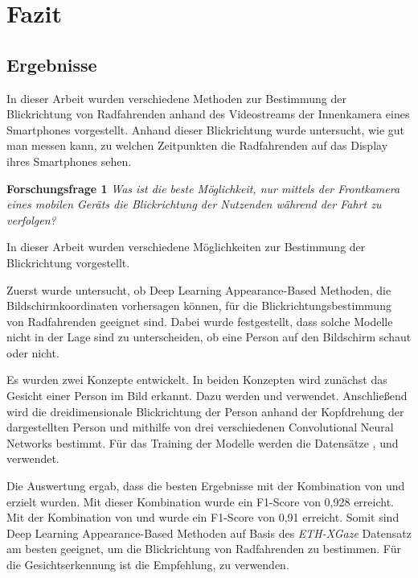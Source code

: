 \chapter{Fazit}\label{sec:fazit}

\section{Ergebnisse}

In dieser Arbeit wurden verschiedene Methoden zur Bestimmung der Blickrichtung von Radfahrenden anhand des Videostreams der Innenkamera eines Smartphones vorgestellt. Anhand dieser Blickrichtung wurde untersucht, wie gut man messen kann, zu welchen Zeitpunkten die Radfahrenden auf das Display ihres Smartphones sehen.

\vspace{0.3cm}
\noindent\textbf{Forschungsfrage 1} \textit{Was ist die beste Möglichkeit, nur mittels der Frontkamera eines mobilen Geräts die Blickrichtung der Nutzenden während der Fahrt zu verfolgen?}
\vspace{0.3cm}

In dieser Arbeit wurden verschiedene Möglichkeiten zur Bestimmung der Blickrichtung vorgestellt.

Zuerst wurde untersucht, ob Deep Learning Appearance-Based Methoden, die Bildschirmkoordinaten vorhersagen können, für die Blickrichtungsbestimmung von Radfahrenden geeignet sind. Dabei wurde festgestellt, dass solche Modelle nicht in der Lage sind zu unterscheiden, ob eine Person auf den Bildschirm schaut oder nicht.

Es wurden zwei Konzepte entwickelt. In beiden Konzepten wird zunächst das Gesicht einer Person im Bild erkannt. Dazu werden \mediapipe und \dlib verwendet. Anschließend wird die dreidimensionale Blickrichtung der Person anhand der Kopfdrehung der dargestellten Person und mithilfe von drei verschiedenen Convolutional Neural Networks bestimmt. Für das Training der Modelle werden die Datensätze \ethg \cite{paper:eth-xgaze}, \gazed \cite{paper:gaze360} und \mpii \cite{paper:mpiifacegaze} verwendet.

Die Auswertung ergab, dass die besten Ergebnisse mit der Kombination von \mediapipe und \ethg erzielt wurden. Mit dieser Kombination wurde ein F1-Score von 0,928 erreicht. Mit der Kombination von \dlib und \ethg wurde ein F1-Score von 0,91 erreicht. Somit sind Deep Learning Appearance-Based Methoden auf Basis des \textit{ETH-XGaze} Datensatz am besten geeignet, um die Blickrichtung von Radfahrenden zu bestimmen. Für die Gesichtserkennung ist die Empfehlung, \mediapipe zu verwenden. 

